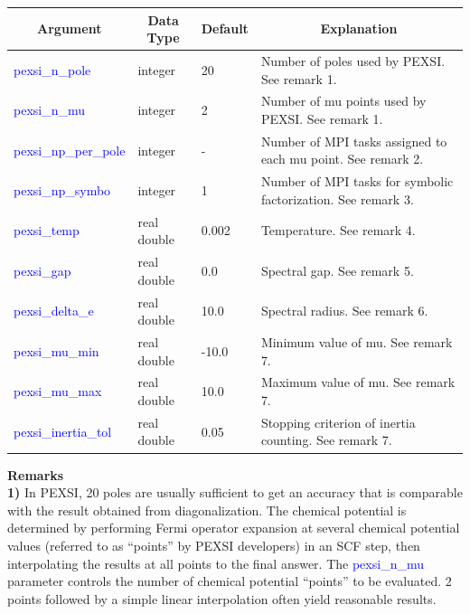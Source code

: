 \documentclass{report}
\begin{document}
\begin{tabular}[]{|p{30mm}|p{20mm}|p{15mm}|p{100mm}|}
\hline
\multicolumn{1}{|c|}{\textbf{Argument}} & \multicolumn{1}{c|}{\textbf{Data Type}} & \multicolumn{1}{c|}{\textbf{Default}} & \multicolumn{1}{c|}{\textbf{Explanation}}\\
\hline
\textcolor{blue}{pexsi\_n\_pole}          & integer     & 20    & Number of poles used by PEXSI.  See remark 1.\\
\hline
\textcolor{blue}{pexsi\_n\_mu}            & integer     & 2     & Number of mu points used by PEXSI.  See remark 1.\\
\hline
\textcolor{blue}{pexsi\_np\_per\_pole}    & integer     & -     & Number of MPI tasks assigned to each mu point.  See remark 2.\\
\hline
\textcolor{blue}{pexsi\_np\_symbo}        & integer     & 1     & Number of MPI tasks for symbolic factorization.  See remark 3.\\
\hline
\textcolor{blue}{pexsi\_temp}             & real double & 0.002 & Temperature.  See remark 4.\\
\hline
\textcolor{blue}{pexsi\_gap}              & real double & 0.0   & Spectral gap.  See remark 5.\\
\hline
\textcolor{blue}{pexsi\_delta\_e}         & real double & 10.0  & Spectral radius.  See remark 6.\\
\hline
\textcolor{blue}{pexsi\_mu\_min}          & real double & -10.0 & Minimum value of mu.  See remark 7.\\
\hline
\textcolor{blue}{pexsi\_mu\_max}          & real double & 10.0  & Maximum value of mu.  See remark 7.\\
\hline
\textcolor{blue}{pexsi\_inertia\_tol}     & real double & 0.05  & Stopping criterion of inertia counting.  See remark 7.\\
\hline
\end{tabular}

\bigskip
\textbf{Remarks}\\

\textbf{1)} In PEXSI, 20 poles are usually sufficient to get an accuracy that is comparable with the result obtained from diagonalization.  The chemical potential is determined by performing Fermi operator expansion at several chemical potential values (referred to as ``points'' by PEXSI developers) in an SCF step, then interpolating the results at all points to the final answer.  The \textcolor{blue}{pexsi\_n\_mu} parameter controls the number of chemical potential ``points'' to be evaluated.  2 points followed by a simple linear interpolation often yield reasonable results.\\
\end{document}
